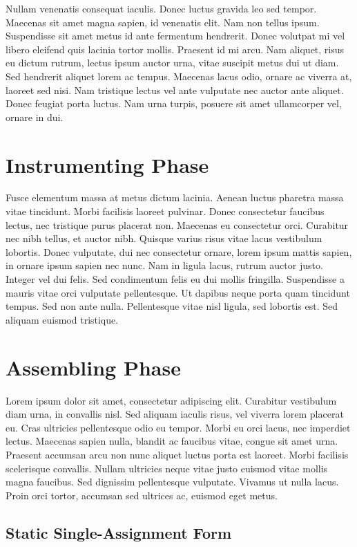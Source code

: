 \documentclass[12pt,twoside,notitlepage]{report}
\begin{document}
Nullam venenatis consequat iaculis. Donec luctus gravida leo sed tempor. Maecenas sit amet magna sapien, id venenatis elit. Nam non tellus ipsum. Suspendisse sit amet metus id ante fermentum hendrerit. Donec volutpat mi vel libero eleifend quis lacinia tortor mollis. Praesent id mi arcu. Nam aliquet, risus eu dictum rutrum, lectus ipsum auctor urna, vitae suscipit metus dui ut diam. Sed hendrerit aliquet lorem ac tempus. Maecenas lacus odio, ornare ac viverra at, laoreet sed nisi. Nam tristique lectus vel ante vulputate nec auctor ante aliquet. Donec feugiat porta luctus. Nam urna turpis, posuere sit amet ullamcorper vel, ornare in dui.

\section{Instrumenting Phase}

Fusce elementum massa at metus dictum lacinia. Aenean luctus pharetra massa vitae tincidunt. Morbi facilisis laoreet pulvinar. Donec consectetur faucibus lectus, nec tristique purus placerat non. Maecenas eu consectetur orci. Curabitur nec nibh tellus, et auctor nibh. Quisque varius risus vitae lacus vestibulum lobortis. Donec vulputate, dui nec consectetur ornare, lorem ipsum mattis sapien, in ornare ipsum sapien nec nunc. Nam in ligula lacus, rutrum auctor justo. Integer vel dui felis. Sed condimentum felis eu dui mollis fringilla. Suspendisse a mauris vitae orci vulputate pellentesque. Ut dapibus neque porta quam tincidunt tempus. Sed non ante nulla. Pellentesque vitae nisl ligula, sed lobortis est. Sed aliquam euismod tristique.

\section{Assembling Phase}

Lorem ipsum dolor sit amet, consectetur adipiscing elit. Curabitur vestibulum diam urna, in convallis nisl. Sed aliquam iaculis risus, vel viverra lorem placerat eu. Cras ultricies pellentesque odio eu tempor. Morbi eu orci lacus, nec imperdiet lectus. Maecenas sapien nulla, blandit ac faucibus vitae, congue sit amet urna. Praesent accumsan arcu non nunc aliquet luctus porta est laoreet. Morbi facilisis scelerisque convallis. Nullam ultricies neque vitae justo euismod vitae mollis magna faucibus. Sed dignissim pellentesque vulputate. Vivamus ut nulla lacus. Proin orci tortor, accumsan sed ultrices ac, euismod eget metus.

\subsection{Static Single-Assignment Form}
\end{document}
